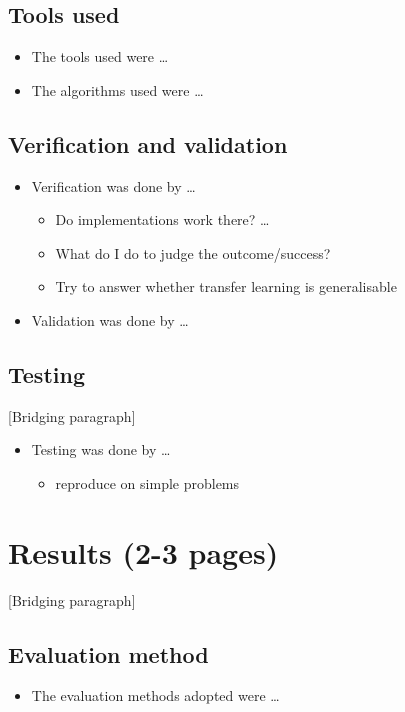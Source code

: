 \documentclass[12pt,a4paper]{article}
\begin{document}
\subsection{Tools used}
\begin{itemize}
    \item The tools used were \dots
    \item The algorithms used were \dots
\end{itemize}

\subsection{Verification and validation}
\begin{itemize}
    \item Verification was done by \dots 
    \begin{itemize}
        \item Do implementations work there? \dots 
        \item What do I do to judge the outcome/success?
        \item Try to answer whether transfer learning is generalisable 
    \end{itemize}
    \item Validation was done by \dots
\end{itemize}

\subsection{Testing}
[Bridging paragraph]
\begin{itemize}
    \item Testing was done by \dots
    \begin{itemize}
        \item reproduce on simple problems
    \end{itemize}
\end{itemize}

\section{Results (2-3 pages)}
[Bridging paragraph]
\subsection{Evaluation method}
\begin{itemize}
    \item The evaluation methods adopted were \dots
\end{itemize}
\end{document}
